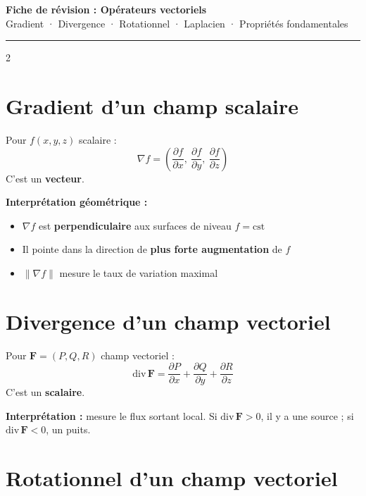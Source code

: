 \documentclass[10pt,a4paper]{article}
\begin{document}
\begin{center}
  {\Large\bfseries\color{bleu} Fiche de révision : Opérateurs vectoriels}\\[3pt]
  {\small Gradient · Divergence · Rotationnel · Laplacien · Propriétés fondamentales}
\end{center}
\noindent\rule{\linewidth}{0.8pt}

\begin{multicols}{2}

\section{Gradient d'un champ scalaire}

\begin{grisbox}
Pour $f(x,y,z)$ scalaire :
$$\boxed{\nabla f = \left(\frac{\partial f}{\partial x},\ \frac{\partial f}{\partial y},\ \frac{\partial f}{\partial z}\right)}$$
C'est un \textbf{vecteur}.
\end{grisbox}

\textbf{Interprétation géométrique :}
\begin{itemize}[leftmargin=1em,itemsep=1pt]
  \item $\nabla f$ est \textbf{perpendiculaire} aux surfaces de niveau $f=\mathrm{cst}$
  \item Il pointe dans la direction de \textbf{plus forte augmentation} de $f$
  \item $\|\nabla f\|$ mesure le taux de variation maximal
\end{itemize}

\section{Divergence d'un champ vectoriel}

\begin{grisbox}
Pour $\mathbf{F}=(P,Q,R)$ champ vectoriel :
$$\boxed{\mathrm{div}\,\mathbf{F} = \frac{\partial P}{\partial x} + \frac{\partial Q}{\partial y} + \frac{\partial R}{\partial z}}$$
C'est un \textbf{scalaire}.
\end{grisbox}

\textbf{Interprétation :} mesure le flux sortant local. Si $\mathrm{div}\,\mathbf{F}>0$, il y a une source ; si $\mathrm{div}\,\mathbf{F}<0$, un puits.

\section{Rotationnel d'un champ vectoriel}


\end{multicols}
\end{document}
